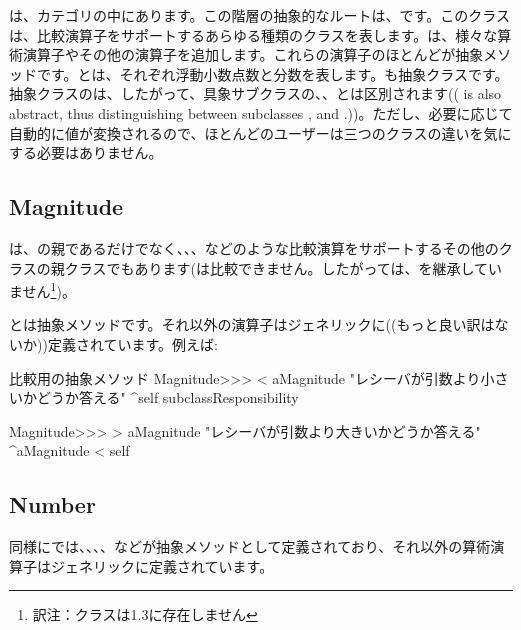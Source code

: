 \documentclass[a4paper,10pt,twoside]{book}
\begin{document}
は、カテゴリの中にあります。この階層の抽象的なルートは、です。このクラスは、比較演算子をサポートするあらゆる種類のクラスを表します。は、様々な算術演算子やその他の演算子を追加します。これらの演算子のほとんどが抽象メソッドです。とは、それぞれ浮動小数点数と分数を表します。も抽象クラスです。抽象クラスのは、したがって、具象サブクラスの、、とは区別されます(( is also abstract, thus distinguishing between subclasses ,  and .))。ただし、必要に応じて自動的に値が変換されるので、ほとんどのユーザーは三つのクラスの違いを気にする必要はありません。

\subsection{Magnitude}

は、の親であるだけでなく、、、などのような比較演算をサポートするその他のクラスの親クラスでもあります(は比較できません。したがっては、を継承していません\footnote{訳注：クラスは\pharo 1.3に存在しません})。

とは抽象メソッドです。それ以外の演算子はジェネリックに((もっと良い訳はないか))定義されています。例えば:

\begin{method}{比較用の抽象メソッド}
Magnitude>>> < aMagnitude 
    "レシーバが引数より小さいかどうか答える"
    ^self subclassResponsibility

Magnitude>>> > aMagnitude 
    "レシーバが引数より大きいかどうか答える"
    ^aMagnitude < self
\end{method}

\subsection{Number}

同様にでは、、、、などが抽象メソッドとして定義されており、それ以外の算術演算子はジェネリックに定義されています。
\end{document}
